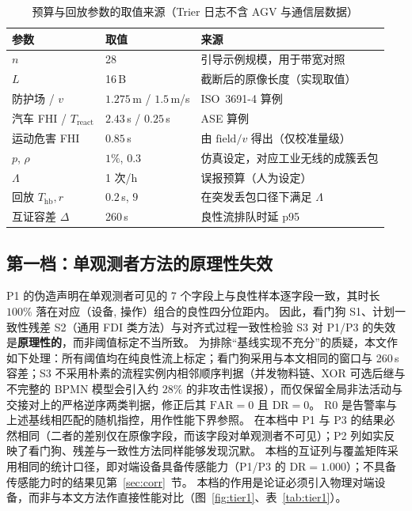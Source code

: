 \documentclass[manuscript,screen,review]{acmart}
\begin{document}
\begin{table}[t]
  \centering
  \caption{预算与回放参数的取值来源（Trier 日志不含 AGV 与通信层数据）}
  \label{tab:params}
  \begin{tabular}{@{}llp{}@{}}
    \toprule
    参数 & 取值 & 来源 \\
    \midrule
    $n$ & 28 & 引导示例规模，用于带宽对照 \\
    $L$ & 16\,B & 截断后的原像长度（实现取值） \\
    防护场 / $v$ & $1.275$\,m / $1.5$\,m/s & ISO~3691-4 算例~\cite{iso3691} \\
    汽车 FHI / $T_{\mathrm{react}}$ & $2.43$\,s / $0.25$\,s & ASE 算例~\cite{ase2023fhi} \\
    运动危害 FHI & $0.85$\,s & 由 $\mathrm{field}/v$ 得出（仅校准量级） \\
    $p$, $\rho$ & $1\%$, $0.3$ & 仿真设定，对应工业无线的成簇丢包 \\
    $\Lambda$ & 1 次/h & 误报预算（人为设定） \\
    回放 $T_{\mathrm{hb}},r$ & $0.2$\,s, $9$ & 在突发丢包口径下满足 $\Lambda$ \\
    互证容差 $\Delta$ & 260\,s & 良性流排队时延 p95 \\
    \bottomrule
  \end{tabular}
\end{table}

\subsection{第一档：单观测者方法的原理性失效}
\label{sec:tier1}

P1 的伪造声明在单观测者可见的 7 个字段上与良性样本逐字段一致，其时长 $100\%$ 落在对应（设备, 操作）组合的良性四分位距内。
因此，看门狗 S1、计划一致性残差 S2（通用 FDI 类方法）与对齐式过程一致性检验 S3 对 P1/P3 的失效是\textbf{原理性的}，而非阈值标定不当所致。
为排除``基线实现不充分''的质疑，本文作如下处理：所有阈值均在纯良性流上标定；看门狗采用与本文相同的窗口与 260\,s 容差；S3 不采用朴素的流程实例内相邻顺序判据（并发物料链、XOR 可选后继与不完整的 BPMN 模型会引入约 $28\%$ 的非攻击性误报），而仅保留全局非法活动与交接对上的严格逆序两类判据，修正后其 $\mathrm{FAR}{=}0$ 且 $\mathrm{DR}{=}0$。
R0 是告警率与上述基线相匹配的随机指控，用作性能下界参照。
在本档中 P1 与 P3 的结果必然相同（二者的差别仅在原像字段，而该字段对单观测者不可见）；P2 列如实反映了看门狗、残差与一致性方法同样能够发现沉默。
本档的互证列与覆盖矩阵采用相同的统计口径，即对端设备具备传感能力（P1/P3 的 DR${=}1.000$）；不具备传感能力时的结果见第~\ref{sec:corr}~节。
本档的作用是论证必须引入物理对端设备，而非与本文方法作直接性能对比（图~\ref{fig:tier1}、表~\ref{tab:tier1}）。
\end{document}

